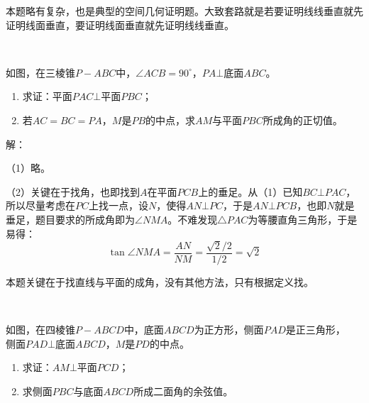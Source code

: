 \begin{tcolorbox}
本题略有复杂，也是典型的空间几何证明题。大致套路就是若要证明线线垂直就先证明线面垂直，要证明线面垂直就先证明线线垂直。
\end{tcolorbox}

~

\begin{example}
如图，在三棱锥$P-ABC$中，$\angle ACB=90^\circ$，$PA\bot \text{底面}ABC$。
\begin{enumerate}
    \item 求证：$\text{平面}PAC\bot \text{平面}PBC$；
    \item 若$AC=BC=PA$，$M$是$PB$的中点，求$AM$与平面$PBC$所成角的正切值。
\end{enumerate}
\end{example}

\begin{figure}[h]
\centering
{}
\end{figure}

解：

（1）略。

（2）关键在于找角，也即找到$A$在平面$PCB$上的垂足。从（1）已知$BC\bot PAC$，所以尽量考虑在$PC$上找一点，设$N$，使得$AN\bot PC$，于是$AN\bot PCB$，也即$N$就是垂足，题目要求的所成角即为$\angle NMA$。不难发现$\bigtriangleup PAC$为等腰直角三角形，于是易得：
\[
\tan \angle NMA=\frac{AN}{NM}=\frac{\sqrt{2}/2}{1/2}=\sqrt{2}
\]

\begin{tcolorbox}
本题关键在于找直线与平面的成角，没有其他方法，只有根据定义找。
\end{tcolorbox}

~

\begin{example}
如图，在四棱锥$P-ABCD$中，底面$ABCD$为正方形，侧面$PAD$是正三角形，$\text{侧面}PAD\bot \text{底面}ABCD$，$M$是$PD$的中点。
\begin{enumerate}
    \item 求证：$AM\bot \text{平面}PCD$；
    \item 求侧面$PBC$与底面$ABCD$所成二面角的余弦值。
\end{enumerate}
\end{example}

